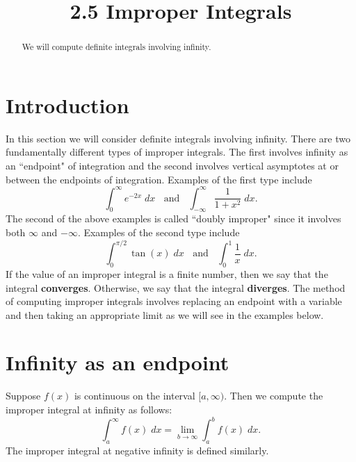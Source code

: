 \documentclass{ximera}
\title{2.5 Improper Integrals}
\begin{document}
\begin{abstract}
We will compute definite integrals involving infinity.
\end{abstract}

\maketitle

\section{Introduction}
In this section we will consider definite integrals involving infinity.
There are two fundamentally different types of improper integrals.  The first involves infinity as an ``endpoint"
of integration and the second involves vertical asymptotes at or between the endpoints of integration.
Examples of the first type include
\[
\int_0^\infty e^{-2x} \; dx \; \; \text{ and } \;  \; \int_{-\infty}^\infty \frac{1}{1+x^2}\; dx.
\]
The second of the above examples is called ``doubly improper" since it involves both $\infty$ and $-\infty$.
Examples of the second type include
\[
\int_0^{\pi/2} \tan(x)\; dx \; \; \text{ and } \; \; \int_0^1 \frac{1}{x} \; dx.
\]
If the value of an improper integral is a finite number, then we say that the integral \textbf{converges}.
Otherwise, we say that the integral \textbf{diverges}.
The method of computing improper integrals involves replacing an endpoint with a variable 
and then taking an appropriate limit as we will see in the examples below.




\section{Infinity as an endpoint}
\begin{definition}
Suppose $f(x)$ is continuous on the interval $[a, \infty)$. Then we compute the improper integral at infinity as follows:
\[
\int_a^\infty f(x) \; dx = \lim_{b \to \infty} \int_a^b f(x) \; dx.
\]
The improper integral at negative infinity is defined similarly.
\end{definition}
\end{document}
